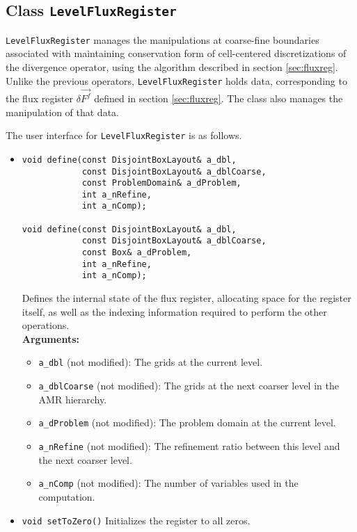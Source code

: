 \subsection{Class {\tt LevelFluxRegister}}

{\tt LevelFluxRegister} manages the manipulations at coarse-fine boundaries
associated with maintaining conservation form of cell-centered
discretizations of the divergence operator, using the algorithm
described in section \ref{sec:fluxreg}. Unlike the previous operators, 
{\tt LevelFluxRegister} holds data, corresponding to the flux register 
$\delta \vec{F^f}$ defined in section \ref{sec:fluxreg}. 
The class also manages the manipulation of that data. 

The user interface for {\tt LevelFluxRegister} is as follows.

\begin{itemize}

\item
\begin{verbatim}
void define(const DisjointBoxLayout& a_dbl,
            const DisjointBoxLayout& a_dblCoarse,
            const ProblemDomain& a_dProblem,
            int a_nRefine,
            int a_nComp);

void define(const DisjointBoxLayout& a_dbl,
            const DisjointBoxLayout& a_dblCoarse,
            const Box& a_dProblem,
            int a_nRefine,
            int a_nComp);
\end{verbatim}
Defines the internal state of the flux register, allocating space for
the register itself, as well as the indexing information required to
perform the other operations. 
\\ {\bf Arguments:} 
  \begin{itemize}
  \item
  \verb/a_dbl/ (not modified):
  The grids at the current level.        
  \item
  \verb/a_dblCoarse/ (not modified):
  The grids at the next coarser level in the AMR hierarchy.
  \item
  \verb/a_dProblem/ (not modified):
  The problem domain at the current level.
  \item
  \verb/a_nRefine/ (not modified):
  The refinement ratio between this level and the next coarser level.
  \item
  \verb/a_nComp/ (not modified):
  The number of variables used in the computation.
  \end{itemize}

\item
{\tt void setToZero()} Initializes the register to all zeros.


\end{itemize}
